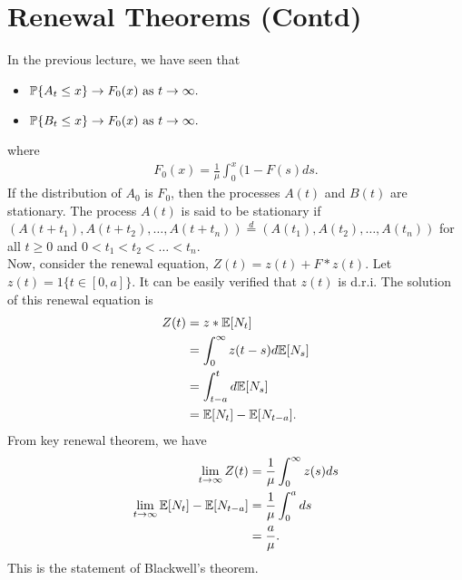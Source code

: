 \documentclass[all-lectures.tex]{subfiles}
\begin{document}

\setcounter{section}{4}
\setcounter{subsection}{0}
 
\section*{} %
{\color{blue}
\section{Renewal Theorems (Contd)}
In the previous lecture, we have seen that 
\begin{itemize}
\item $\P\{A_t \leq x\} \to F_0(x) \text{ as } t\to\infty.$
\item $\P\{B_t \leq x\} \to F_0(x) \text{ as } t\to\infty.$
\end{itemize}
where 
\begin{align*}
F_0(x) = \frac{1}{\mu} \int_0^x (1-F(s) ds.
\end{align*}
If the distribution of $A_0$ is $F_0$, then the processes $A(t)$ and $B(t)$ are stationary. The process $A(t)$ is said to be stationary if $(A(t+t_1),A(t+t_2),\dots,A(t+t_n)) \stackrel{d}{=} (A(t_1),A(t_2),\dots,A(t_n))$  for all $t\geq 0$ and $0 < t_1 <t_2 < \dots < t_n$. \\
Now, consider the renewal equation, $Z(t) = z(t) + F*z(t)$. Let $z(t) = 1\{t \in [0,a]\}$. It can be easily verified that $z(t)$ is d.r.i. The solution of this renewal equation is 
\begin{align*}
Z(t) &= z * \E[N_t] \\
&= \int_0^\infty z(t-s) d \E[N_s] \\
&= \int_{t-a}^t d\E[N_s]  \\
&= \E[N_t] - \E[N_{t-a}].
\end{align*}
From  key renewal theorem, we have 
\begin{align*}
\lim_{t \to \infty} Z(t) &= \frac{1}{\mu} \int_0^\infty z(s) ds \\
\lim_{t \to \infty} \E[N_t] - \E[N_{t-a}] &= \frac{1}{\mu} \int_0^a ds \\
&= \frac{a}{\mu}.
\end{align*}
This is the statement of Blackwell's theorem. 
}
\end{document}
